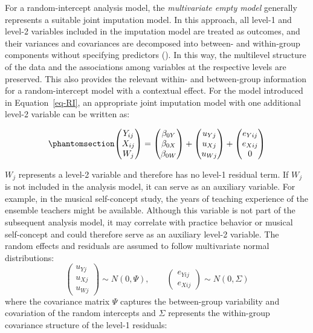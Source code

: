 \documentclass[
  letterpaper,
  11pt,
  english,
  singlespacing,
  headsepline,
  openany]{MastersDoctoralThesis}
\begin{document}
For a random-intercept analysis model, the \emph{multivariate empty
model} generally represents a suitable joint imputation model. In this
approach, all level-1 and level-2 variables included in the imputation
model are treated as outcomes, and their variances and covariances are
decomposed into between- and within-group components without specifying
predictors (). In this way,
the multilevel structure of the data and the associations among
variables at the respective levels are preserved. This also provides the
relevant within- and between-group information for a random-intercept
model with a contextual effect. For the model introduced in
Equation~\ref{eq-RI}, an appropriate joint imputation model with one
additional level-2 variable can be written as:

\begin{equation}\phantomsection\label{eq-imputationmodel}{ 
\left(
\begin{matrix}
Y_{ij} \\
X_{ij} \\
W_j
\end{matrix}
\right)
=
\left(
\begin{matrix}
\beta_{0Y} \\
\beta_{0X} \\
\beta_{0W}
\end{matrix}
\right)
+
\left(
\begin{matrix}
u_{Yj} \\
u_{Xj} \\
u_{Wj}
\end{matrix}
\right)
+
\left(
\begin{matrix}
e_{Yij} \\
e_{Xij} \\
0
\end{matrix}
\right)
}\end{equation}

\(W_j\) represents a level-2 variable and therefore has no level-1
residual term. If \(W_j\) is not included in the analysis model, it can
serve as an auxiliary variable. For example, in the musical self-concept
study, the years of teaching experience of the ensemble teachers might
be available. Although this variable is not part of the subsequent
analysis model, it may correlate with practice behavior or musical
self-concept and could therefore serve as an auxiliary level-2 variable.
The random effects and residuals are assumed to follow multivariate
normal distributions: \[
\left(
\begin{matrix}
u_{Yj} \\
u_{Xj} \\
u_{Wj}
\end{matrix}
\right)
\sim N(0,\Psi),
\qquad
\left(
\begin{matrix}
e_{Yij} \\
e_{Xij}
\end{matrix}
\right)
\sim N(0,\Sigma)
\] where the covariance matrix \(\Psi\) captures the between-group
variability and covariation of the random intercepts and \(\Sigma\)
represents the within-group covariance structure of the level-1
residuals:
\end{document}
